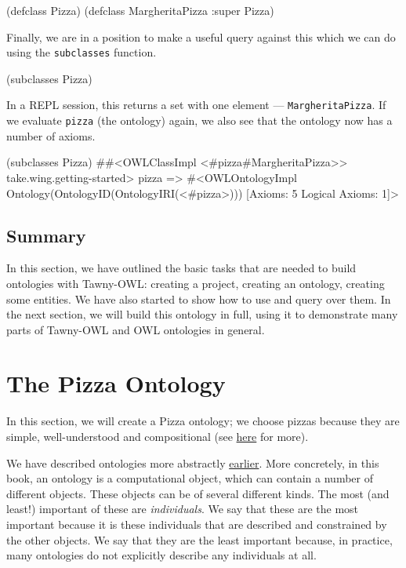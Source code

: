 \documentclass[11pt]{article}
\begin{document}
\begin{tawny}
(defclass Pizza)
(defclass MargheritaPizza :super Pizza)
\end{tawny}

Finally, we are in a position to make a useful query against this which
we can do using the \texttt{subclasses} function.

\begin{tawny}
(subclasses Pizza)
\end{tawny}

In a REPL session, this returns a set with one element ---
\texttt{MargheritaPizza}. If we evaluate \texttt{pizza} (the ontology) again, we also
see that the ontology now has a number of axioms.


\begin{tawny}
(subclasses Pizza)
#{#<OWLClassImpl <#pizza#MargheritaPizza>>}
take.wing.getting-started> pizza
=> #<OWLOntologyImpl Ontology(OntologyID(OntologyIRI(<#pizza>))) [Axioms: 5 Logical Axioms: 1]>
\end{tawny}


\subsection{Summary}
\label{sec-4-5}

In this section, we have outlined the basic tasks that are needed to
build ontologies with Tawny-OWL: creating a project, creating an
ontology, creating some entities. We have also started to show how to
use and query over them. In the next section, we will build this
ontology in full, using it to demonstrate many parts of Tawny-OWL and
OWL ontologies in general.





\section{The Pizza Ontology}
\label{sec-5}

In this section, we will create a Pizza ontology; we choose pizzas because
they are simple, well-understood and compositional (see \href{http://robertdavidstevens.wordpress.com/2010/01/22/why-the-pizza-ontology-tutorial/}{here} for more).

We have described ontologies more abstractly \hyperref[what_is_an_ontology]{earlier}. More concretely, in this
book, an ontology is a computational object, which can contain a number of
different objects. These objects can be of several different kinds. The most
(and least!) important of these are \emph{individuals}. We say that these are the
most important because it is these individuals that are described and
constrained by the other objects. We say that they are the least important
because, in practice, many ontologies do not explicitly describe any
individuals at all.
\end{document}
